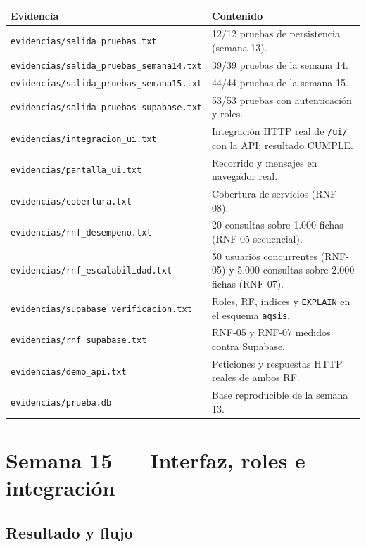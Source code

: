 \documentclass[11pt,a4paper]{article}
\newcommand{\code}[1]{\texttt{#1}}
\newcommand{\thead}[1]{\textbf{#1}}
\begin{document}
{\footnotesize
\begin{tabularx}{\linewidth}{@{}V{0.7}V{1.3}@{}}
\toprule
\thead{Evidencia} & \thead{Contenido} \\ \midrule
\code{evidencias/salida\_pruebas.txt} & 12/12 pruebas de persistencia
(semana 13). \\
\code{evidencias/salida\_pruebas\_semana14.txt} & 39/39 pruebas de la
semana 14. \\
\code{evidencias/salida\_pruebas\_semana15.txt} & 44/44 pruebas de la
semana 15. \\
\code{evidencias/salida\_pruebas\_supabase.txt} & 53/53 pruebas con
autenticación y roles. \\
\code{evidencias/integracion\_ui.txt} & Integración HTTP real de \code{/ui/}
con la API; resultado CUMPLE. \\
\code{evidencias/pantalla\_ui.txt} & Recorrido y mensajes en navegador real. \\
\code{evidencias/cobertura.txt} & Cobertura de servicios (RNF-08). \\
\code{evidencias/rnf\_desempeno.txt} & 20 consultas sobre 1.000 fichas
(RNF-05 secuencial). \\
\code{evidencias/rnf\_escalabilidad.txt} & 50 usuarios concurrentes (RNF-05) y
5.000 consultas sobre 2.000 fichas (RNF-07). \\
\code{evidencias/supabase\_verificacion.txt} & Roles, RF, índices y
\code{EXPLAIN} en el esquema \code{aqsis}. \\
\code{evidencias/rnf\_supabase.txt} & RNF-05 y RNF-07 medidos contra Supabase. \\
\code{evidencias/demo\_api.txt} & Peticiones y respuestas HTTP reales de ambos
RF. \\
\code{evidencias/prueba.db} & Base reproducible de la semana 13. \\
\bottomrule
\end{tabularx}
}

\clearpage

\section{Semana 15 --- Interfaz, roles e integración}

\subsection{Resultado y flujo}
\end{document}
